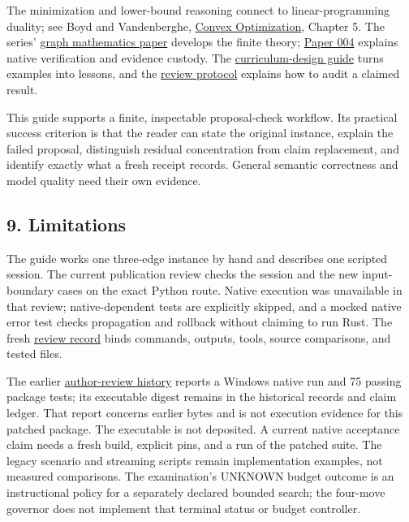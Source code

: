 \documentclass[
  11pt,
]{article}
\begin{document}
The minimization and lower-bound reasoning connect to linear-programming
duality; see Boyd and Vandenberghe,
\href{https://doi.org/10.1017/CBO9780511804441}{Convex Optimization},
Chapter 5. The series'
\href{../001_pfp_discrete_cochain_retraction_and_toy_involutions/paper.md}{graph
mathematics paper} develops the finite theory;
\href{../004_pfp_native_verification_and_evidence_custody/paper.md}{Paper
004} explains native verification and evidence custody. The
\href{../007_pfp_executable_lessons_and_evidence_boundaries/paper.md}{curriculum-design
guide} turns examples into lessons, and the
\href{../009_pfp_adversarial_dialectics_and_terminal_reality_gates/paper.md}{review
protocol} explains how to audit a claimed result.

This guide supports a finite, inspectable proposal-check workflow. Its
practical success criterion is that the reader can state the original
instance, explain the failed proposal, distinguish residual
concentration from claim replacement, and identify exactly what a fresh
receipt records. General semantic correctness and model quality need
their own evidence.

\hypertarget{limitations}{%
\subsection{9. Limitations}\label{limitations}}

The guide works one three-edge instance by hand and describes one
scripted session. The current publication review checks the session and
the new input-boundary cases on the exact Python route. Native execution
was unavailable in that review; native-dependent tests are explicitly
skipped, and a mocked native error test checks propagation and rollback
without claiming to run Rust. The fresh
\href{docs/publication_review_2026_10_02.json}{review record} binds
commands, outputs, tools, source comparisons, and tested files.

The earlier \href{paper_change_log.md}{author-review history} reports a
Windows native run and 75 passing package tests; its executable digest
remains in the historical records and claim ledger. That report concerns
earlier bytes and is not execution evidence for this patched package.
The executable is not deposited. A current native acceptance claim needs
a fresh build, explicit pins, and a run of the patched suite. The legacy
scenario and streaming scripts remain implementation examples, not
measured comparisons. The examination's UNKNOWN budget outcome is an
instructional policy for a separately declared bounded search; the
four-move governor does not implement that terminal status or budget
controller.
\end{document}
